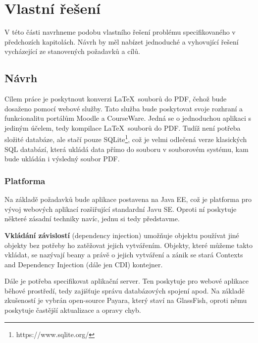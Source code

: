 \chapter{Vlastní řešení}  

V této části navrhneme podobu vlastního řešení problému specifikovaného v předchozích kapitolách. Návrh by měl nabízet jednoduché a vyhovující řešení vycházející ze stanovených požadavků a cílů. 

\section{Návrh}

Cílem práce je poskytnout konverzi \LaTeX\ souborů do PDF, čehož bude dosaženo pomocí webové služby. Tato služba bude poskytovat svoje rozhraní a funkcionalitu portálům Moodle a CourseWare. Jedná se o jednoduchou aplikaci s jediným účelem, tedy kompilace \LaTeX\ souborů do PDF. Tudíž není potřeba složité databáze, ale stačí pouze SQLite\footnote{https://www.sqlite.org/}, což je velmi odlečená verze klasických SQL databází, která ukládá data přímo do souboru v souborovém systému, kam bude ukládán i výsledný soubor PDF. 

\subsection{Platforma}
Na základě požadavků bude aplikace postavena na Java EE, což je platforma pro vývoj webových aplikací rozšiřující standardní Javu SE. Oproti ní poskytuje některé zásadní techniky navíc, jednu si tedy představme. 
\par
\textbf{Vkládání závislostí} (dependency injection) umožňuje objektu používat jiné objekty bez potřeby ho zatěžovat jejich vytvářením. Objekty, které můžeme takto vkládat, se nazývají beany a právě o jejich vytváření a zánik se stará Contexts and Dependency Injection (dále jen CDI) kontejner.
\\[12pt]
\par
Dále je potřeba specifikovat aplikační server. Ten poskytuje pro webové aplikace běhové prostředí, tedy zajišťuje správu databázových spojení apod. Na základě zkušeností je vybrán open-source Payara, který staví na GlassFish, oproti němu poskytuje častější aktualizace a opravy chyb. 

